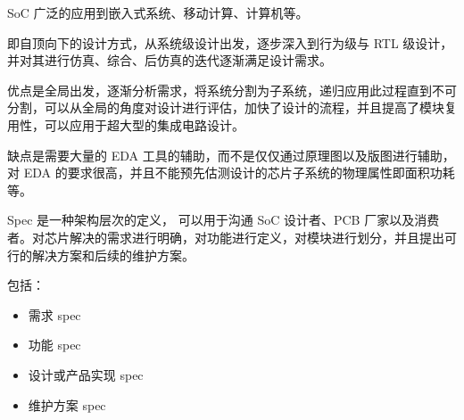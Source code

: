 \documentclass[lang=cn,11pt,a4paper,cite=authoryear]{elegantpaper}
\begin{document}
SoC 广泛的应用到嵌入式系统、移动计算、计算机等。


即自顶向下的设计方式，从系统级设计出发，逐步深入到行为级与 RTL 级设计，并对其进行仿真、综合、后仿真的迭代逐渐满足设计需求。

优点是全局出发，逐渐分析需求，将系统分割为子系统，递归应用此过程直到不可分割，可以从全局的角度对设计进行评估，加快了设计的流程，并且提高了模块复用性，可以应用于超大型的集成电路设计。

缺点是需要大量的 EDA 工具的辅助，而不是仅仅通过原理图以及版图进行辅助，对 EDA 的要求很高，并且不能预先估测设计的芯片子系统的物理属性即面积功耗等。


Spec 是一种架构层次的定义， 可以用于沟通 SoC 设计者、PCB 厂家以及消费者。对芯片解决的需求进行明确，对功能进行定义，对模块进行划分，并且提出可行的解决方案和后续的维护方案。

包括：

\begin{itemize}
    \item 需求 spec
    \item 功能 spec
    \item 设计或产品实现 spec
    \item 维护方案 spec
\end{itemize}
\end{document}
